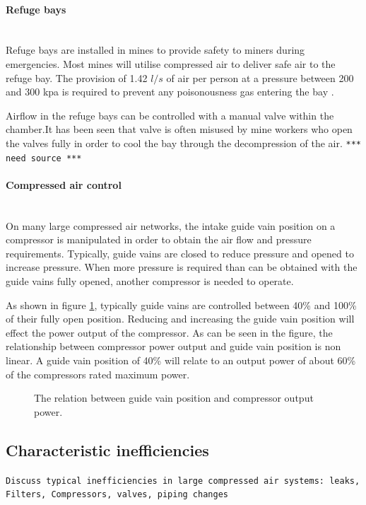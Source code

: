 \paragraph*{Refuge bays}\leavevmode\\
Refuge bays are installed in mines to provide safety to miners during emergencies. Most mines will utilise compressed air to deliver safe air to the refuge bay. The provision of 1.42 $l/s$ of air per person at a pressure between 200 and 300 \gls{kpa} is required to prevent any poisonousness gas entering the bay \cite{brake1999criteria}.\par
Airflow in the refuge bays can be controlled with a manual valve within the chamber.It has been seen that valve is often misused by mine workers who open the valves fully in order to cool the bay through the decompression of the air. \texttt{*** need source ***}
\paragraph*{Compressed air control}\leavevmode\\
On many large compressed air networks, the intake guide vain position on a compressor is manipulated in order to obtain the air flow and pressure requirements. Typically, guide vains are closed to reduce pressure and opened to increase pressure. When more pressure is required than can be obtained with the guide vains fully opened, another compressor is needed to operate.\par
 As shown in figure \ref{fig: Guide vain position}, typically guide vains are controlled between 40\% and 100\% of their fully open position. Reducing and increasing the guide vain position will effect the power output of the compressor. As can be seen in the figure, the relationship between compressor power output and guide vain position is non linear. A guide vain position of 40\% will relate to an output power of about 60\% of the compressors rated maximum power.
 	\begin{figure}[h]
 	\centering
 	\fbox{}
 	\caption[The relation between guide vain position and compressor output power.]{The relation between guide vain position and compressor output power.}
 	\label{fig: Guide vain position}
 \end{figure}
 
	\subsection{Characteristic inefficiencies}
	\texttt{Discuss typical inefficiencies in large  compressed air systems: leaks, Filters, Compressors, valves, piping changes}
